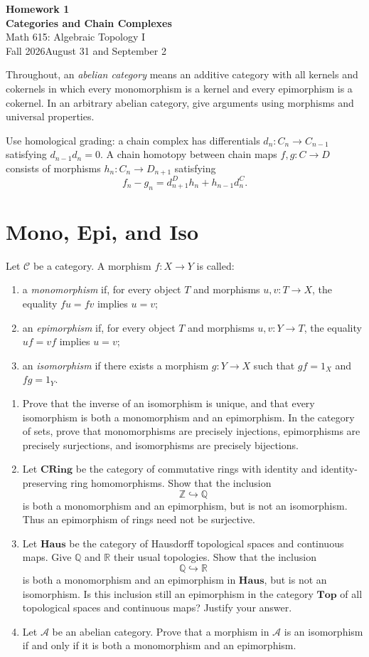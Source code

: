 \documentclass[11pt]{article}
\newcommand{\coursetitle}[3]{\begin{center}{\large\bfseries\color{teal}#1}\\[4pt]{\LARGE\bfseries\color{teal}#2}\\[6pt]Math 615: Algebraic Topology I\\Fall 2026\quad\textbar\quad #3\end{center}}
\newcommand{\Z}{\mathbb{Z}}
\newcommand{\Q}{\mathbb{Q}}
\newcommand{\R}{\mathbb{R}}
\begin{document}
\coursetitle{Homework 1}{Categories and Chain Complexes}{August 31 and September 2}
Throughout, an \emph{abelian category} means an additive category with all
kernels and cokernels in which every monomorphism is a kernel and every
epimorphism is a cokernel. In an arbitrary abelian category, give arguments
using morphisms and universal properties.

Use homological grading: a chain complex has differentials
\(d_n:C_n\to C_{n-1}\) satisfying \(d_{n-1}d_n=0\).
A chain homotopy between chain maps \(f,g:C\to D\) consists of morphisms
\(h_n:C_n\to D_{n+1}\) satisfying
\[
f_n-g_n=d^D_{n+1}h_n+h_{n-1}d^C_n.
\]

\section{Mono, Epi, and Iso}
Let \(\mathcal C\) be a category. A morphism \(f:X\to Y\) is called:
\begin{enumerate}[leftmargin=*]
\item a \emph{monomorphism} if, for every object \(T\) and morphisms
\(u,v:T\to X\), the equality \(fu=fv\) implies \(u=v\);
\item an \emph{epimorphism} if, for every object \(T\) and morphisms
\(u,v:Y\to T\), the equality \(uf=vf\) implies \(u=v\);
\item an \emph{isomorphism} if there exists a morphism \(g:Y\to X\)
such that \(gf=1_X\) and \(fg=1_Y\).
\end{enumerate}

\begin{enumerate}
\item Prove that the inverse of an isomorphism is unique, and that every
isomorphism is both a monomorphism and an epimorphism. In the category of
sets, prove that monomorphisms are precisely injections, epimorphisms are
precisely surjections, and isomorphisms are precisely bijections.

\item Let \(\mathbf{CRing}\) be the category of commutative rings with
identity and identity-preserving ring homomorphisms. Show that the inclusion
\[
\Z\hookrightarrow\Q
\]
is both a monomorphism and an epimorphism, but is not an isomorphism. Thus
an epimorphism of rings need not be surjective.

\item Let \(\mathbf{Haus}\) be the category of Hausdorff topological spaces
and continuous maps. Give \(\Q\) and \(\R\) their usual topologies. Show
that the inclusion
\[
\Q\hookrightarrow\R
\]
is both a monomorphism and an epimorphism in \(\mathbf{Haus}\), but is not
an isomorphism. Is this inclusion still an epimorphism in the category
\(\mathbf{Top}\) of all topological spaces and continuous maps? Justify
your answer.

\item Let \(\mathcal A\) be an abelian category. Prove that a morphism
in \(\mathcal A\) is an isomorphism if and only if it is both a
monomorphism and an epimorphism.
\end{enumerate}
\end{document}
